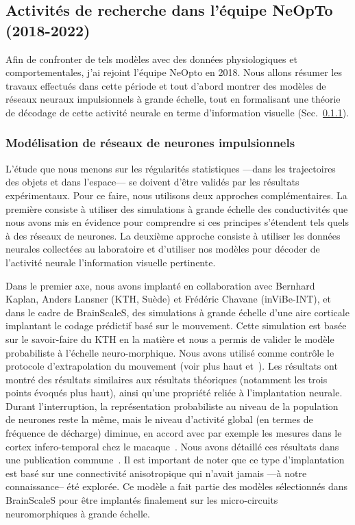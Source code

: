 \subsection{Activités de recherche dans l'équipe NeOpTo (2018-2022)}
\label{sec:neopto}

Afin de confronter de tels modèles avec des données physiologiques et comportementales, j'ai rejoint l'équipe NeOpto en 2018. Nous allons résumer les travaux effectués dans cette période et tout d'abord montrer des modèles de réseaux neuraux impulsionnels à grande échelle, tout en formalisant une théorie de décodage de cette activité neurale en terme d'information visuelle (Sec.~\ref{sec:spikes}).

\subsubsection{Modélisation de réseaux de neurones impulsionnels}%
\label{sec:spikes}
L'étude que nous menons sur les régularités statistiques ---dans les trajectoires des objets et dans l'espace--- se doivent d'être validés par les résultats expérimentaux. Pour ce faire, nous utilisons deux approches complémentaires. La première consiste à utiliser des simulations à grande échelle des conductivités que nous avons mis en évidence pour comprendre si ces principes s'étendent tels quels à des réseaux de neurones. La deuxième approche consiste à utiliser les données neurales collectées au laboratoire et d'utiliser nos modèles pour décoder de l'activité neurale l'information visuelle pertinente.

Dans le premier axe, nous avons implanté en collaboration avec Bernhard Kaplan, Anders Lansner (KTH, Suède) et Frédéric Chavane (inViBe-INT), et dans le cadre de BrainScaleS, des simulations à grande échelle d'une aire corticale implantant le codage prédictif basé sur le mouvement. Cette simulation est basée sur le savoir-faire du KTH en la matière et nous a permis de valider le modèle probabiliste à l'échelle neuro-morphique. Nous avons utilisé comme contrôle le protocole d'extrapolation du mouvement (voir plus haut et~\citep{Khoei13jpp}). Les résultats ont montré des résultats similaires aux résultats théoriques (notamment les trois points évoqués plus haut), ainsi qu'une propriété reliée à l'implantation neurale. Durant l'interruption, la représentation probabiliste au niveau de la population de neurones reste la même, mais le niveau d'activité global (en termes de fréquence de décharge) diminue, en accord avec par exemple les mesures dans le cortex infero-temporal chez le macaque~\citep{Assad95}. Nous avons détaillé ces résultats dans une publication commune~\citep{KaplanKhoei14}. Il est important de noter que ce type d'implantation est basé sur une connectivité anisotropique qui n'avait jamais ---à notre connaissance-- été explorée. Ce modèle a fait partie des modèles sélectionnés dans BrainScaleS pour être implantés finalement sur les micro-circuits neuromorphiques à grande échelle.

